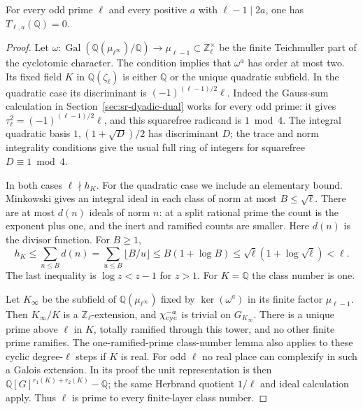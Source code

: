 \begin{srproposition}\label{prop:sr-rational-resonant}
For every odd prime \(\ell\) and every positive \(a\) with
\(\ell-1\mid2a\), one has \(T_{\ell,a}(\mathbb Q)=0\).
\end{srproposition}
\begin{proof}
Let \(\omega:\operatorname{Gal}(\mathbb Q(\mu_{\ell^\infty})/\mathbb Q)
\to\mu_{\ell-1}\subset\mathbb Z_\ell^\times\) be the finite
Teichmuller part of the cyclotomic character.
The condition implies that \(\omega^a\) has order at most two.
Its fixed field \(K\) in \(\mathbb Q(\zeta_\ell)\) is either
\(\mathbb Q\) or the unique quadratic subfield.
In the quadratic case its discriminant is
\((-1)^{(\ell-1)/2}\ell\).
Indeed the Gauss-sum calculation in Section~\ref{sec:sr-dyadic-dual}
works for every odd prime: it gives
\(\tau_\ell^2=(-1)^{(\ell-1)/2}\ell\), and this squarefree radicand
is \(1\bmod4\).
The integral quadratic basis \(1,(1+\sqrt D)/2\) has discriminant
\(D\); the trace and norm integrality conditions give the usual
full ring of integers for squarefree \(D\equiv1\bmod4\).

In both cases \(\ell\nmid h_K\). For the quadratic case we include
an elementary bound. Minkowski gives an integral ideal in each class
of norm at most \(B\leq\sqrt\ell\).
There are at most \(d(n)\) ideals of norm \(n\): at a split rational
prime the count is the exponent plus one, and the inert and ramified
counts are smaller. Here \(d(n)\) is the divisor function.
For \(B\geq1\),
\[
 h_K\leq\sum_{n\leq B}d(n)
 =\sum_{u\leq B}\lfloor B/u\rfloor
 \leq B(1+\log B)
 \leq\sqrt\ell(1+\log\sqrt\ell)<\ell .
\]
The last inequality is \(\log z<z-1\) for \(z>1\).
For \(K=\mathbb Q\) the class number is one.

Let \(K_\infty\) be the subfield of
\(\mathbb Q(\mu_{\ell^\infty})\) fixed by
\(\ker(\omega^a)\) in its finite factor \(\mu_{\ell-1}\).
Then \(K_\infty/K\) is a \(\mathbb Z_\ell\)-extension, and
\(\chi_{\rm cyc}^{-a}\) is trivial on \(G_{K_\infty}\).
There is a unique prime above \(\ell\) in \(K\), totally ramified
through this tower, and no other finite prime ramifies.
The one-ramified-prime class-number lemma also applies to these
cyclic degree-\(\ell\) steps if \(K\) is real.
For odd \(\ell\) no real place can complexify in such a Galois
extension. In its proof the unit representation is then
\(\mathbb Q[G]^{r_1(K)+r_2(K)}-\mathbb Q\);
the same Herbrand quotient \(1/\ell\) and ideal calculation apply.
Thus \(\ell\) is prime to every finite-layer class number.


\end{proof}
